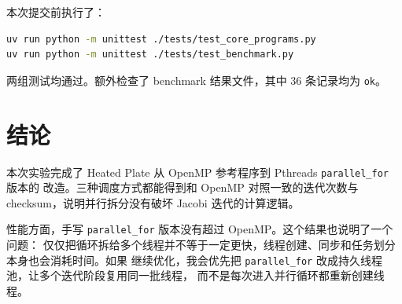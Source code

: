 \documentclass[UTF8,a4paper,12pt,fontset=none]{ctexart}
\begin{document}
本次提交前执行了：
\begin{lstlisting}[language=bash]
uv run python -m unittest ./tests/test_core_programs.py
uv run python -m unittest ./tests/test_benchmark.py
\end{lstlisting}

两组测试均通过。额外检查了 benchmark 结果文件，其中 36 条记录均为 \texttt{ok}。

\section{结论}

本次实验完成了 Heated Plate 从 OpenMP 参考程序到 Pthreads \texttt{parallel\_for} 版本的
改造。三种调度方式都能得到和 OpenMP 对照一致的迭代次数与 checksum，说明并行拆分没有破坏
Jacobi 迭代的计算逻辑。

性能方面，手写 \texttt{parallel\_for} 版本没有超过 OpenMP。这个结果也说明了一个问题：
仅仅把循环拆给多个线程并不等于一定更快，线程创建、同步和任务划分本身也会消耗时间。如果
继续优化，我会优先把 \texttt{parallel\_for} 改成持久线程池，让多个迭代阶段复用同一批线程，
而不是每次进入并行循环都重新创建线程。
\end{document}
